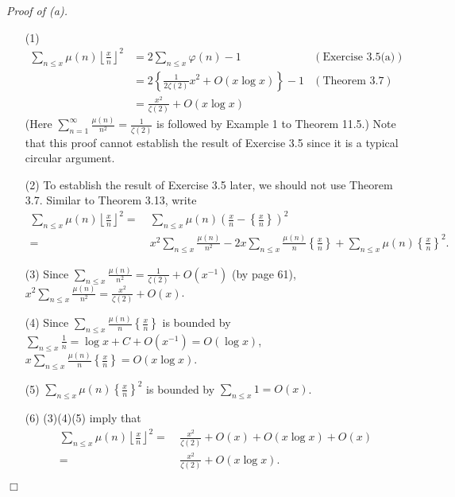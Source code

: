 \documentclass{article}
\begin{document}
\emph{Proof of (a).}
\begin{enumerate}
\item[(1)]
  \begin{align*}
    \sum_{n \leq x} \mu(n) \left\lfloor \frac{x}{n} \right\rfloor^2
    &= 2 \sum_{n \leq x} \varphi(n) - 1
      &(\text{Exercise 3.5(a)}) \\
    &= 2 \left\{ \frac{1}{2 \zeta(2)} x^2 + O(x \log x) \right\} - 1
      &(\text{Theorem 3.7}) \\
    &= \frac{x^2}{\zeta(2)} + O(x \log x)
  \end{align*}
  (Here $\sum_{n=1}^{\infty} \frac{\mu(n)}{n^2} = \frac{1}{\zeta(2)}$ is
  followed by Example 1 to Theorem 11.5.)
  Note that this proof cannot establish the result of Exercise 3.5 since
  it is a typical circular argument.

\item[(2)]
  To establish the result of Exercise 3.5 later, we should not use Theorem 3.7.
  Similar to Theorem 3.13, write
  \begin{align*}
    \sum_{n \leq x} \mu(n) \left\lfloor \frac{x}{n} \right\rfloor^2
    = & \:
    \sum_{n \leq x} \mu(n) \left( \frac{x}{n} - \left\{\frac{x}{n}\right\} \right)^2 \\
    = & \:
    x^2 \sum_{n \leq x} \frac{\mu(n)}{n^2}
        - 2x \sum_{n \leq x} \frac{\mu(n)}{n}\left\{\frac{x}{n}\right\}
        + \sum_{n \leq x} \mu(n) \left\{\frac{x}{n}\right\}^2.
  \end{align*}

\item[(3)]
  Since $\sum_{n \leq x} \frac{\mu(n)}{n^2} = \frac{1}{\zeta(2)} + O(x^{-1})$ (by page 61),
  $x^2 \sum_{n \leq x} \frac{\mu(n)}{n^2} = \frac{x^2}{\zeta(2)} + O(x)$.

\item[(4)]
  Since $\sum_{n \leq x} \frac{\mu(n)}{n}\left\{\frac{x}{n}\right\}$ is bounded by
  $\sum_{n \leq x} \frac{1}{n} = \log x + C + O(x^{-1}) = O(\log x)$,
  $x \sum_{n \leq x} \frac{\mu(n)}{n}\left\{\frac{x}{n}\right\} = O(x \log x)$.

\item[(5)]
  $\sum_{n \leq x} \mu(n) \left\{\frac{x}{n}\right\}^2$ is bounded by
  $\sum_{n \leq x} 1 = O(x)$.

\item[(6)]
  (3)(4)(5) imply that
  \begin{align*}
    \sum_{n \leq x} \mu(n) \left\lfloor \frac{x}{n} \right\rfloor^2
    = & \:
    \frac{x^2}{\zeta(2)} + O(x) + O(x \log x) + O(x) \\
    = & \:
    \frac{x^2}{\zeta(2)} + O(x \log x).
  \end{align*}
\end{enumerate}
$\Box$ \\
\end{document}
